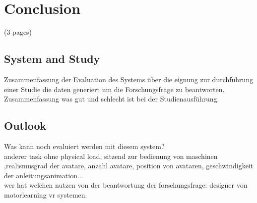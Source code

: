 \chapter{Conclusion}
(3 pages)
\section{System and Study}
Zusammenfassung der Evaluation des Systems über die eignung zur durchführung einer Studie die daten generiert um die Forschungsfrage zu beantworten.\\
Zusammenfassung was gut und schlecht ist bei der Studienausführung.
\section{Outlook}
Was kann noch evaluiert werden mit diesem system?\\
anderer task ohne physical load, sitzend zur bedienung von maschinen ,realismusgrad der avatare, anzahl avatare, position von avataren, geschwindigkeit der anleitungsanimation...\\
wer hat welchen nutzen von der beantwortung der forschungsfrage: designer von motorlearning vr systemen.
